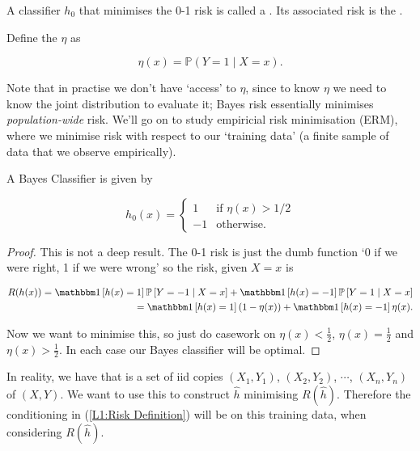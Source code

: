 \documentclass[11pt]{scrartcl}
\begin{document}
A classifier $h_0$ that minimises the 0-1 risk is called a . Its associated risk is the .

Define the  $\eta$ as 

\begin{equation}
    \eta(x) = \mathbb{P}(Y=1\mid X=x).
    \label{L1:Regression Function}
\end{equation}

Note that in practise we don't have `access' to $\eta$, since to know $\eta$ we need to know the joint distribution to evaluate it; Bayes risk essentially minimises \textit{population-wide} risk. We'll go on to study empiricial risk minimisation (ERM), where we minimise risk with respect to our `training data' (a finite sample of data that we observe empirically).

\begin{theorem}
\label{not deep Bayes}
A Bayes Classifier is given by 

\begin{equation}
    h_0(x) = 
    \begin{cases} 
      1 & \text{if $\eta(x) > 1/2$} \\
      -1 & \text{otherwise.}
   \end{cases}
\label{L1:Bayes Example}
\end{equation}

\begin{proof}
This is not a deep result. The 0-1 risk is just the dumb function `0 if we were right, 1 if we were wrong' so the risk, given $X=x$ is

\begin{align*}
    R(h(x)) = \one{h(x) = 1} \P{Y = -1 \mid X = x} + \one{h(x) = -1} \P{Y = 1 \mid X = x} \\
    = \one{h(x) = 1} (1 - \eta(x)) + \one{h(x) = -1} \eta(x).
\end{align*}

Now we want to minimise this, so just do casework on $\eta(x) < \frac12$, $\eta(x) = \frac12$ and $\eta(x) > \frac12$. In each case our Bayes classifier will be optimal.
\end{proof}

\end{theorem}

In reality, we have  that is a set of iid copies $(X_1, Y_1)$, $(X_2, Y_2)$, $\cdots$, $(X_n, Y_n)$ of $(X, Y)$. We want to use this to construct $\hat{h}$ minimising $R(\hat{h})$. Therefore the conditioning in (\ref{L1:Risk Definition}) will be on this training data, when considering $R(\hat{h})$.
\end{document}
